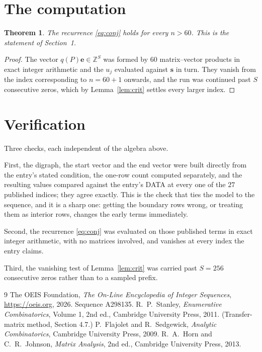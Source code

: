 \documentclass[11pt,a4paper]{article}
\theoremstyle{plain}
\newtheorem{theorem}{Theorem}
\theoremstyle{definition}
\begin{document}
\section{The computation}

\begin{theorem}
The recurrence \eqref{eq:conj} holds for every $n>60$. This is the statement of
Section~1.
\end{theorem}

\begin{proof}
The vector $q(P)\mathbf{e}\in\mathbb{Z}^{S}$ was formed by $60$ matrix--vector
products in exact integer arithmetic and the $u_j$ evaluated against $\mathbf{s}$ in turn.
They vanish from the index corresponding to $n=60+1$ onwards, and the run was continued
past $S$ consecutive zeros, which by Lemma~\ref{lem:crit} settles every larger index.
\end{proof}

\section{Verification}

Three checks, each independent of the algebra above.

First, the digraph, the start vector and the end vector were built directly from the
entry's stated condition, the one-row count computed separately, and the resulting values
compared against the entry's DATA at every one of the $27$ published indices; they
agree exactly. This is the check that ties the model to the sequence, and it is a sharp one:
getting the boundary rows wrong, or treating them as interior rows, changes the early terms
immediately.

Second, the recurrence \eqref{eq:conj} was evaluated on those published terms in exact
integer arithmetic, with no matrices involved, and vanishes at every index the entry claims.

Third, the vanishing test of Lemma~\ref{lem:crit} was carried past $S=256$ consecutive
zeros rather than to a sampled prefix.

\begin{thebibliography}{9}
 The OEIS Foundation, \emph{The On-Line Encyclopedia of Integer
Sequences}, \url{https://oeis.org}, 2026. Sequence A298135.
 R.~P.~Stanley, \emph{Enumerative Combinatorics}, Volume 1, 2nd ed.,
Cambridge University Press, 2011. (Transfer-matrix method, Section 4.7.)
 P.~Flajolet and R.~Sedgewick, \emph{Analytic Combinatorics}, Cambridge
University Press, 2009.
 R.~A.~Horn and C.~R.~Johnson, \emph{Matrix Analysis}, 2nd ed., Cambridge
University Press, 2013.
\end{thebibliography}
\end{document}
